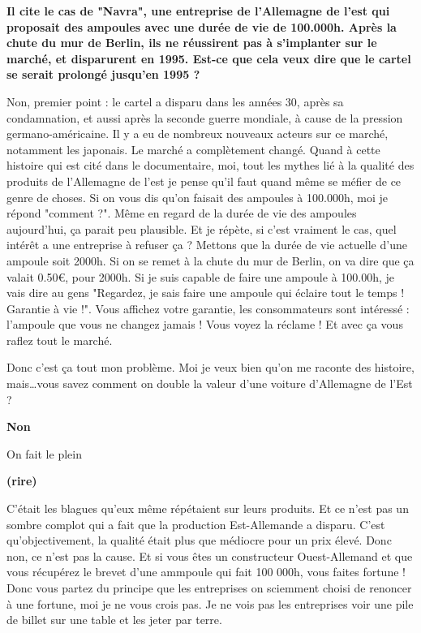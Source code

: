 \begin{small}
\textbf{Il cite le cas de "Navra", une entreprise de l'Allemagne de l'est qui proposait des ampoules avec une durée de vie de 100.000h. Après la chute du mur de Berlin, ils ne réussirent pas à s'implanter sur le marché, et disparurent en 1995. Est-ce que cela veux dire que le cartel se serait prolongé jusqu'en 1995 ?}
\smallbreak


Non, premier point : le cartel a disparu dans les années 30, après sa condamnation, et aussi après la seconde guerre mondiale, à cause de la pression germano-américaine. Il y a eu de nombreux nouveaux acteurs sur ce marché, notamment les japonais. Le marché a complètement changé.
Quand à cette histoire qui est cité dans le documentaire, moi, tout les mythes lié à la qualité des produits de l'Allemagne de l'est  je pense qu'il faut quand même se méfier de ce genre de choses.
Si on vous dis qu'on faisait des ampoules à 100.000h, moi je répond "comment ?". Même en regard de la durée de vie des ampoules aujourd’hui, ça parait peu plausible.
Et je répète, si c'est vraiment le cas, quel intérêt a une entreprise à refuser ça ?
Mettons que la durée de vie actuelle d'une ampoule soit 2000h. Si on se remet à la chute du mur de Berlin, on va dire que ça valait 0.50\euro, pour 2000h.
Si je suis capable de faire une ampoule à 100.00h, je vais dire au gens "Regardez, je sais faire une ampoule qui éclaire tout le temps ! Garantie à vie !". Vous affichez votre garantie, les consommateurs sont intéressé : l'ampoule que vous ne changez jamais ! Vous voyez la réclame !
Et avec ça vous raflez tout le marché.

Donc c'est ça tout mon problème. Moi je veux bien qu'on me raconte des histoire, mais\dots vous savez comment on double la valeur d'une voiture d'Allemagne de l'Est ?

\textbf{Non}
\smallbreak


On fait le plein

\textbf{(rire) }
\smallbreak


C'était les blagues qu'eux même répétaient sur leurs produits. Et ce n'est pas un sombre complot qui a fait que la production Est-Allemande a disparu. C'est qu'objectivement, la qualité était plus que médiocre pour un prix élevé. Donc non, ce n'est pas la cause. Et si vous êtes un constructeur Ouest-Allemand et que vous récupérez le brevet d'une ammpoule qui fait 100 000h, vous faites fortune !
Donc vous partez du principe que les entreprises on sciemment choisi de renoncer à une fortune, moi je ne vous crois pas. Je ne vois pas les entreprises voir une pile de billet sur une table et les jeter par terre.


\end{small}
